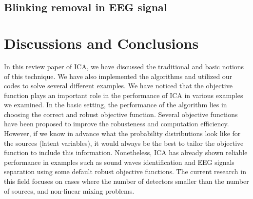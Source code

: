 \documentclass[aps,prl,preprint,superscriptaddress]{revtex4-2}
\begin{document}
\subsection{Blinking removal in EEG signal}








\section{Discussions and Conclusions}
In this review paper of ICA, we have discussed the traditional and basic notions of this technique. We have also implemented the algorithms and utilized our codes to solve several different examples. We have noticed that the objective function plays an important role in the performance of ICA in various examples we examined. In the basic setting, the performance of the algorithm lies in choosing the correct and robust objective function. Several objective functions have been proposed to improve the robusteness and computation efficiency. However, if we know in advance what the probability distributions look like for the sources (latent variables), it would always be the best to tailor the objective function to include this information. Nonetheless, ICA has already shown reliable performance in examples such as sound waves identification and EEG signals separation using some default robust objective functions. The current research in this field focuses on cases where the number of detectors smaller than the number of sources, and non-linear mixing problems. 

{}
\end{document}
